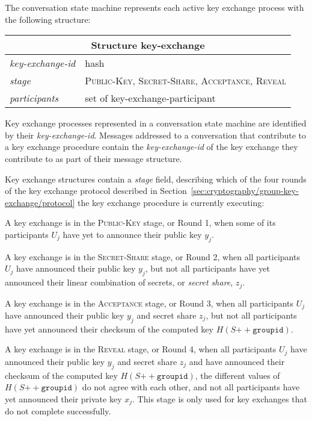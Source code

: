 \documentclass{article}
\def\smfield#1{\textsl{#1}}
\def\type#1{\textsf{#1}}
\def\concat{\mathbin{+\!\!\!+}}
\newenvironment{struct}[1]{
\newcommand{\structfield}[2]{
\smfield{##1} & \type{##2} \\
\hline
}
\par
\vspace{-\medskipamount}
\hspace{2em minus 2em}\begin{tabular}{|l|l|}
\hline
\multicolumn{2}{|c|}{Structure \type{#1}} \\
\hline
\hline
}{
\end{tabular}
\vspace{-\medskipamount}
\par
}
\begin{document}
The conversation state machine represents each active key exchange process with the following structure:
\begin{struct}{key-exchange}
\structfield{key-exchange-id}{hash}
\structfield{stage}{\normalfont \textsc{Public-Key}, \textsc{Secret-Share}, \textsc{Acceptance}, \textsc{Reveal}}
\structfield{participants}{set of key-exchange-participant}
\end{struct}
Key exchange processes represented in a conversation state machine are identified by their \smfield{key-exchange-id}.
Messages addressed to a conversation that contribute to a key exchange procedure contain the \smfield{key-exchange-id} of the key exchange they contribute to as part of their message structure.

Key exchange structures contain a \smfield{stage} field, describing which of the four rounds of the key exchange protocol described in Section~\ref{sec:cryptography/group-key-exchange/protocol} the key exchange procedure is currently executing:
\begin{description}[noitemsep]
\item[\normalfont \textsc{Public-Key.}] A key exchange is in the \textsc{Public-Key} stage, or Round 1, when some of its participants $U_j$ have yet to announce their public key $y_j$.
\item[\normalfont \textsc{Secret-Share.}] A key exchange is in the \textsc{Secret-Share} stage, or Round 2, when all participants $U_j$ have announced their public key $y_j$, but not all participants have yet announced their linear combination of secrets, or \emph{secret share}, $z_j$.
\item[\normalfont \textsc{Acceptance.}] A key exchange is in the \textsc{Acceptance} stage, or Round 3, when all participants $U_j$ have announced their public key $y_j$ and secret share $z_j$, but not all participants have yet announced their checksum of the computed key $H(S \concat \texttt{groupid})$.
\item[\normalfont \textsc{Reveal.}] A key exchange is in the \textsc{Reveal} stage, or Round 4, when all participants $U_j$ have announced their public key $y_j$ and secret share $z_j$ and have announced their checksum of the computed key $H(S \concat \texttt{groupid})$, the different values of $H(S \concat \texttt{groupid})$ do not agree with each other, and not all participants have yet announced their private key $x_j$. This stage is only used for key exchanges that do not complete successfully.
\end{description}
\end{document}
